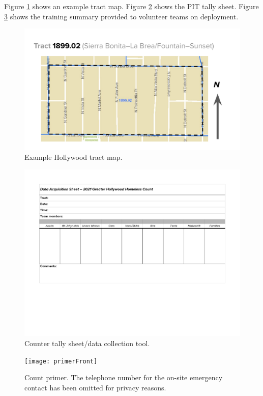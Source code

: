 \documentclass[11pt,twocolumn]{article}
\begin{document}
Figure \ref{fig:tractMap} shows an example tract map. 
Figure \ref{fig:tallySheet} shows the PIT tally sheet.
Figure \ref{fig:primer} shows the training summary provided to volunteer
teams on deployment.

\begin{figure}[t]
	\centering
	\includegraphics[width =\linewidth, trim = 1cm 0cm 1cm 0cm]{tractMap}
	\caption{Example Hollywood tract map.}
	\label{fig:tractMap}
\end{figure}

\begin{figure}[t]
	\centering
	\includegraphics[width =\linewidth, trim = 2cm 6cm 2cm 0cm]{Hollywood2021CountDataSheet}
	\caption{Counter tally sheet/data collection tool.}
	\label{fig:tallySheet}
\end{figure}

\begin{figure}[t]
	\centering
	\texttt{[image: primerFront]}
	\caption{Count primer. The telephone number for the on-site emergency contact has been omitted for 
			privacy reasons.}
	\label{fig:primer}
\end{figure}
\end{document}
